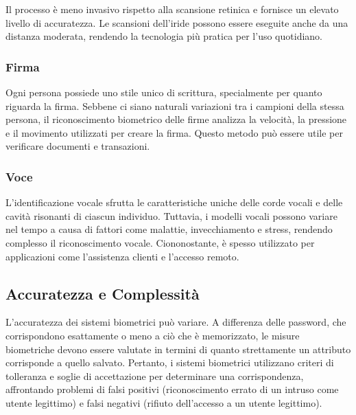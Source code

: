 Il processo è meno invasivo rispetto alla scansione retinica e fornisce un elevato livello di accuratezza. Le scansioni dell'iride possono essere eseguite anche da una distanza moderata, rendendo la tecnologia più pratica per l'uso quotidiano.

\subsubsection{Firma}

Ogni persona possiede uno stile unico di scrittura, specialmente per quanto riguarda la firma. Sebbene ci siano naturali variazioni tra i campioni della stessa persona, il riconoscimento biometrico delle firme analizza la velocità, la pressione e il movimento utilizzati per creare la firma. Questo metodo può essere utile per verificare documenti e transazioni.

\subsubsection{Voce}

L'identificazione vocale sfrutta le caratteristiche uniche delle corde vocali e delle cavità risonanti di ciascun individuo. Tuttavia, i modelli vocali possono variare nel tempo a causa di fattori come malattie, invecchiamento e stress, rendendo complesso il riconoscimento vocale. Ciononostante, è spesso utilizzato per applicazioni come l'assistenza clienti e l'accesso remoto.

\subsection{Accuratezza e Complessità}

L'accuratezza dei sistemi biometrici può variare. A differenza delle password, che corrispondono esattamente o meno a ciò che è memorizzato, le misure biometriche devono essere valutate in termini di quanto strettamente un attributo corrisponde a quello salvato. Pertanto, i sistemi biometrici utilizzano criteri di tolleranza e soglie di accettazione per determinare una corrispondenza, affrontando problemi di falsi positivi (riconoscimento errato di un intruso come utente legittimo) e falsi negativi (rifiuto dell'accesso a un utente legittimo).